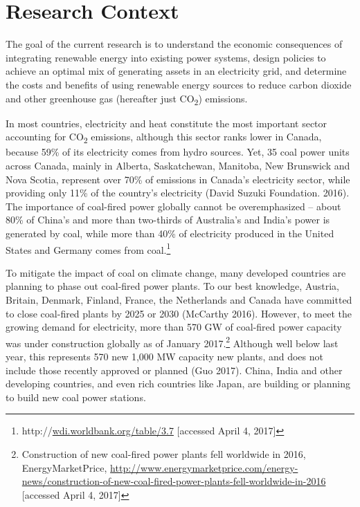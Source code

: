 \section{Research Context}\label{research-context}

The goal of the current research is to understand the economic
consequences of integrating renewable energy into existing power
systems, design policies to achieve an optimal mix of generating assets
in an electricity grid, and determine the costs and benefits of using
renewable energy sources to reduce carbon dioxide and other greenhouse
gas (hereafter just CO\textsubscript{2}) emissions.

In most countries, electricity and heat constitute the most important
sector accounting for CO\textsubscript{2} emissions, although this
sector ranks lower in Canada, because 59\% of its electricity comes from
hydro sources. Yet, 35 coal power units across Canada, mainly in
Alberta, Saskatchewan, Manitoba, New Brunswick and Nova Scotia,
represent over 70\% of emissions in Canada's electricity sector, while
providing only 11\% of the country's electricity (David Suzuki
Foundation. 2016). The importance of coal-fired power globally cannot be
overemphasized -- about 80\% of China's and more than two-thirds of
Australia's and India's power is generated by coal, while more than 40\%
of electricity produced in the United States and Germany comes from
coal.\footnote{http://\href{http://wdi.worldbank.org/table/3.7\%20accessed\%20September\%2018}{wdi.worldbank.org/table/3.7}
  {[}accessed April 4, 2017{]}}

To mitigate the impact of coal on climate change, many developed
countries are planning to phase out coal-fired power plants. To our best
knowledge, Austria, Britain, Denmark, Finland, France, the Netherlands
and Canada have committed to close coal-fired plants by 2025 or 2030
(McCarthy 2016). However, to meet the growing demand for electricity,
more than 570 GW of coal-fired power capacity was under construction
globally as of January 2017.\footnote{Construction of new coal-fired
  power plants fell worldwide in 2016, EnergyMarketPrice,
  \url{http://www.energymarketprice.com/energy-news/construction-of-new-coal-fired-power-plants-fell-worldwide-in-2016}
  {[}accessed April 4, 2017{]}} Although well below last year, this
represents 570 new 1,000 MW capacity new plants, and does not include
those recently approved or planned (Guo 2017). China, India and other
developing countries, and even rich countries like Japan, are building
or planning to build new coal power stations.

